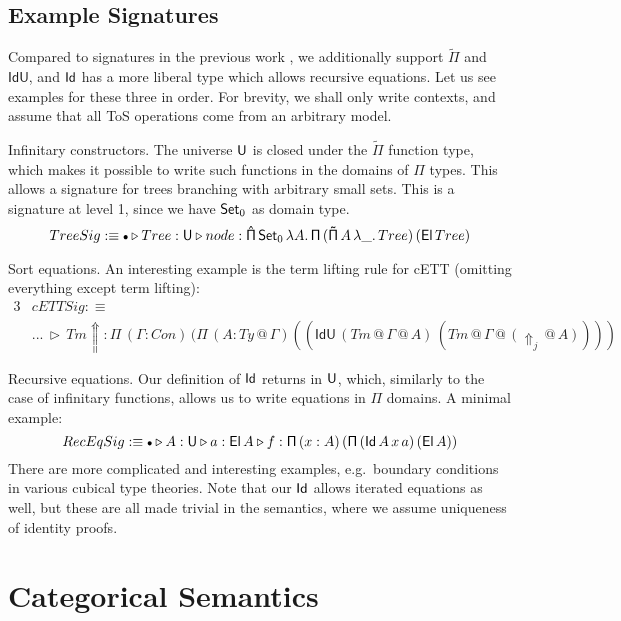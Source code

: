 \documentclass{llncs}
\makeatletter
\newcommand{\Lift}{\Uparrow}
\newcommand{\ext}{\triangleright}
\newcommand{\emptycon}{\scaleobj{.75}\bullet}
\newcommand{\Pii}{\mathsf{\Pi}}
\newcommand{\Pie}{\mathsf{\hat{\Pi}}}
\newcommand{\Piinf}{\mathsf{\tilde{\Pi}}}
\newcommand{\appitt}{\mathop{{\scriptstyle @}}}
\newcommand{\IdU}{\mathsf{IdU}}
\makeatother
\begin{document}
\subsection{Example Signatures}

Compared to signatures in the previous work \cite{TODO}, we additionally support
$\Piinf$ and $\IdU$, and $\mathsf{Id}$ has a more liberal type which allows recursive
equations. Let us see examples for these three in order. For brevity, we shall
only write contexts, and assume that all ToS operations come from an arbitrary
model.

\begin{example}{Infinitary constructors}. The universe $\mathsf{U}$ is closed under
the $\Piinf$ function type, which makes it possible to write such functions in
the domains of $\Pii$ types. This allows a signature for trees branching with
arbitrary small sets. This is a signature at level 1, since we have $\mathsf{Set}_0$ as
domain type.
\[
TreeSig :\equiv
\emptycon \ext Tree : \U \ext node : \Pie\,\Set_0\,\lambda A.\,\Pii\,(\Piinf\,A\,\lambda \_.\,Tree)\,(\El\,Tree)
\]
\end{example}

\begin{example}{Sort equations}. An interesting example is the term lifting
rule for cETT (omitting everything except term lifting):
\begin{alignat*}{3}
  & cETTSig :\equiv \\
  & ...\,\ext\,Tm{\Lift} : \Pii\,(\Gamma : Con)\,(\Pii\,(A : Ty{\appitt}\Gamma)((\IdU\,(Tm{\appitt}\Gamma{\appitt}A)\,(Tm{\appitt}\Gamma{\appitt}(\Lift_j{\appitt}A))))
\end{alignat*}
\end{example}

\begin{example}{Recursive equations}. Our definition of $\mathsf{Id}$ returns in $\mathsf{U}$,
which, similarly to the case of infinitary functions, allows us to write equations
in $\Pii$ domains. A minimal example:
\[
RecEqSig :\equiv \emptycon \ext A : \U \ext a : \El\,A \ext f : \Pii\,(x : A)\,(\Pii\,(\Id\,A\,x\,a)\,(\El\,A))
\]
There are more complicated and interesting examples, e.g.\ boundary conditions in
various cubical type theories\cite{TODO}. Note that our $\mathsf{Id}$ allows iterated
equations as well, but these are all made trivial in the semantics, where we
assume uniqueness of identity proofs.
\end{example}

\section{Categorical Semantics}
\label{sec:categorical_semantics}
\end{document}
